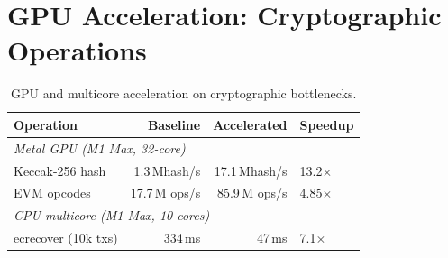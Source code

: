 \section{GPU Acceleration: Cryptographic Operations}


\begin{table}[h]
\centering
\small
\begin{tabular}{lrrl}
\toprule
\textbf{Operation} & \textbf{Baseline} & \textbf{Accelerated} & \textbf{Speedup} \\
\midrule
\multicolumn{4}{l}{\textit{Metal GPU (M1 Max, 32-core)}} \\
Keccak-256 hash    & 1.3\,Mhash/s & 17.1\,Mhash/s & 13.2$\times$ \\
EVM opcodes        & 17.7\,M ops/s & 85.9\,M ops/s & 4.85$\times$ \\
\midrule
\multicolumn{4}{l}{\textit{CPU multicore (M1 Max, 10 cores)}} \\
ecrecover (10k txs)& 334\,ms      & 47\,ms         & 7.1$\times$ \\
\bottomrule
\end{tabular}
\caption{GPU and multicore acceleration on cryptographic bottlenecks.}
\label{tab:gpu}
\end{table}

